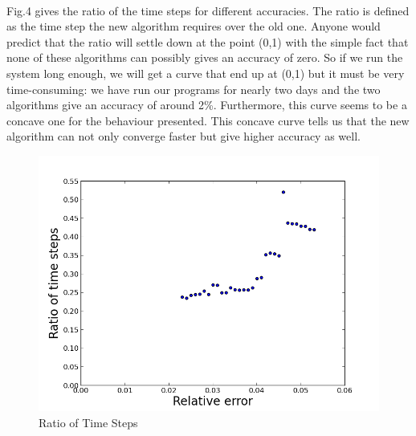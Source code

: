 \documentclass[twocolumn]{article}
\begin{document}
\paragraph*{}
Fig.4 gives the ratio of the time steps for different accuracies. The ratio is defined as the time step the  new algorithm requires over the old one. Anyone would predict that the ratio will settle down at the point (0,1) with the simple fact that none of these algorithms can possibly gives an accuracy of zero. So if we run the system long enough, we will get a curve that end up at (0,1) but it must be very time-consuming: we have run our programs for nearly two days and the two algorithms give an accuracy of around 2\%. Furthermore, this curve seems to be a concave one for the behaviour presented. This concave curve tells us that the new algorithm can not only converge faster but give higher accuracy as well.
\begin{figure}[h] %
\centering
\includegraphics[width=\linewidth]{Comparison.png}
\caption{Ratio of Time Steps}
\end{figure}
\end{document}
